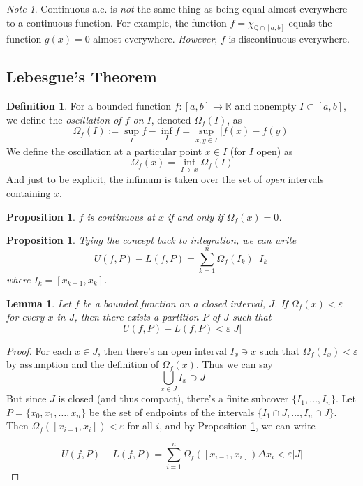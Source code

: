 \documentclass[12pt]{article}
\theoremstyle{plain}
\newtheorem{lem}[thm]{Lemma}
\newtheorem{prop}[thm]{Proposition}
\theoremstyle{definition}
\newtheorem{defn}[thm]{Definition}
\theoremstyle{remark}
\newtheorem*{note}{Note}
\begin{document}
\begin{note}
    Continuous a.e. is \emph{not} the same thing as being equal almost everywhere to a continuous function. For example, the function $f=\chi_{\mathbb{Q} \cap [a,b]}$ equals the function $g(x)=0$ almost everywhere. \emph{However}, $f$ is discontinuous everywhere. 
\end{note}

\subsection{Lebesgue's Theorem}

\begin{defn} 
For a bounded function $f:[a,b]\rightarrow\mathbb{R}$ and nonempty $I\subset[a,b]$, we define the \emph{oscillation of $f$ on $I$}, denoted $\Omega_f(I)$, as
\[
    \Omega_f(I) := \sup_I f - \inf_I f 
    = \sup_{x,y\in I} |f(x)-f(y)|
\]
We define the oscillation at a particular point $x\in I$ (for $I$ open) as 
\[
\Omega_f(x) = \inf_{I\ni \; x} \Omega_f(I)
\]
And just to be explicit, the infimum is taken over the set of \emph{open} intervals containing $x$.
\end{defn}

\begin{prop}
\label{osccts}
$f$ is continuous at $x$ if and only if $\Omega_f(x)=0$.
\end{prop}

\begin{prop}
\label{rewriteuml}
Tying the concept back to integration, we can write 
\[
    U(f,P)-L(f,P) 
    = \sum^n_{k=1} \Omega_f(I_k) \; |I_k|
\]
where $I_k = [x_{k-1}, x_k]$.
\end{prop}

\begin{lem}
    \label{leblem}
Let $f$ be a bounded function on a closed interval, $J$. If $\Omega_f(x) < \varepsilon$ for every $x$ in $J$, then there exists a partition $P$ of $J$ such that 
\[
    U(f,P)- L(f,P) < \varepsilon |J|
\]
\end{lem}

\begin{proof}
For each $x\in J$, then there's an open interval $I_x \ni x$ such that $\Omega_f(I_x)<\varepsilon$ by assumption and the definition of $\Omega_f(x)$. Thus we can say 
\[
    \bigcup_{x\in J} I_x \supset J
\]
But since $J$ is closed (and thus compact), there's a finite subcover $\{I_1, \ldots, I_n\}$. Let $P=\{x_0, x_1, \ldots, x_n\}$ be the set of endpoints of the intervals $\{I_1\cap J, \ldots, I_n\cap J\}$. Then $\Omega_f([x_{i-1},x_i])<\varepsilon$ for all $i$, and by Proposition \ref{rewriteuml}, we can write
 
\[
    U(f,P)- L(f,P) = \sum^n_{i=1} \Omega_f([x_{i-1}, x_i]) \Delta 
    x_i < \varepsilon |J|
\]
\end{proof}
\end{document}
